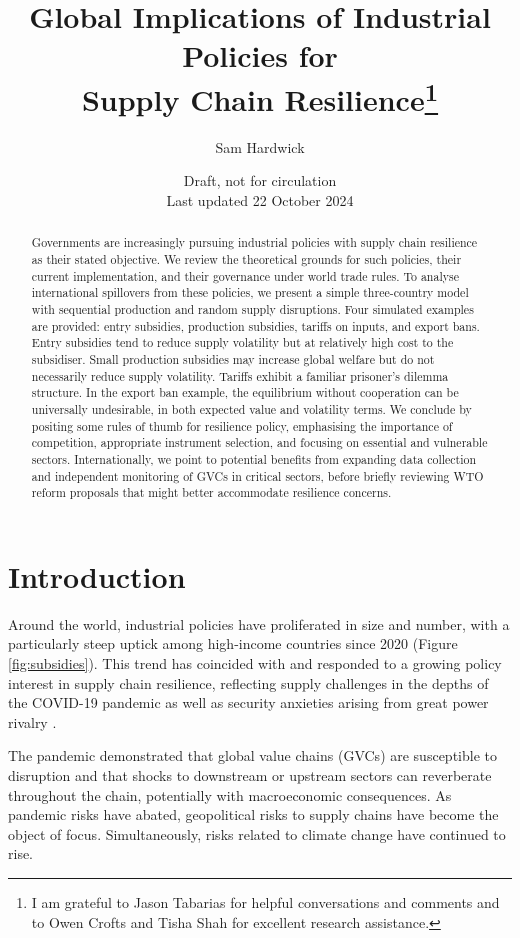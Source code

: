 \documentclass{article}
\title{Global Implications of Industrial Policies for \\ Supply Chain Resilience\thanks{I am grateful to Jason Tabarias for helpful conversations and comments and to Owen Crofts and Tisha Shah for excellent research assistance.}}
\author{Sam Hardwick}
\date{Draft, not for circulation \\ Last updated 22 October 2024}
\begin{document}
\maketitle
\begin{abstract}
    Governments are increasingly pursuing industrial policies with supply chain resilience as their stated objective. We review the theoretical grounds for such policies, their current implementation, and their governance under world trade rules. To analyse international spillovers from these policies, we present a simple three-country model with sequential production and random supply disruptions. Four simulated examples are provided: entry subsidies, production subsidies, tariffs on inputs, and export bans. Entry subsidies tend to reduce supply volatility but at relatively high cost to the subsidiser. Small production subsidies may increase global welfare but do not necessarily reduce supply volatility. Tariffs exhibit a familiar prisoner's dilemma structure. In the export ban example, the equilibrium without cooperation can be universally undesirable, in both expected value and volatility terms. We conclude by positing some rules of thumb for resilience policy, emphasising the importance of competition, appropriate instrument selection, and focusing on essential and vulnerable sectors. Internationally, we point to potential benefits from expanding data collection and independent monitoring of GVCs in critical sectors, before briefly reviewing WTO reform proposals that might better accommodate resilience concerns.
\end{abstract}

\section{Introduction}

Around the world, industrial policies have proliferated in size and number, with a particularly steep uptick among high-income countries since 2020 (Figure \ref{fig:subsidies}). This trend has coincided with and responded to a growing policy interest in supply chain resilience, reflecting supply challenges in the depths of the COVID-19 pandemic as well as security anxieties arising from great power rivalry \parencite{ilyina_industrial_2024}.

The pandemic demonstrated that global value chains (GVCs) are susceptible to disruption and that shocks to downstream or upstream sectors can reverberate throughout the chain, potentially with macroeconomic consequences. As pandemic risks have abated, geopolitical risks to supply chains have become the object of focus. Simultaneously, risks related to climate change have continued to rise.
\end{document}
